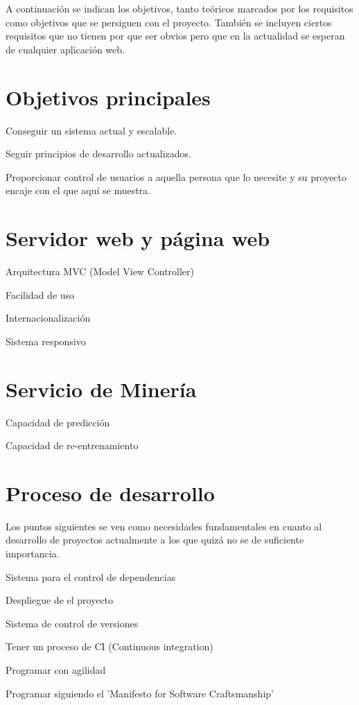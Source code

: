 
A continuación se indican los objetivos, tanto teóricos marcados por los requisitos como objetivos que se persiguen con el proyecto. También se incluyen ciertos requisitos que no tienen por que ser obvios pero que en la actualidad se esperan de cualquier aplicación web.



\section{Objetivos principales} 
\begin{list}{-}{}
\item Conseguir un sistema actual y escalable.
\item Seguir principios de desarrollo actualizados.
\item Proporcionar control de usuarios a aquella persona que lo necesite y su proyecto encaje con el que aquí se muestra.
\end{list}

\section{Servidor web y página web}
\begin{list}{-}{}
\item Arquitectura MVC (Model View Controller)
\item Facilidad de uso
\item Internacionalización
\item Sistema responsivo
\end{list}

\section{Servicio de Minería}
\begin{list}{-}{}
\item Capacidad de predicción
\item Capacidad de re-entrenamiento
\end{list}



\section{Proceso de desarrollo}
Los puntos siguientes se ven como necesidades fundamentales en cuanto al desarrollo de proyectos actualmente a los que quizá no se de suficiente importancia.
\begin{list}{-}{}
\item Sistema para el control de dependencias
\item Despliegue de el proyecto
\item Sistema de control de versiones
\item Tener un proceso de CI (Continuous integration) 
\item Programar con agilidad
\item Programar siguiendo el 'Manifesto for Software Craftsmanship'
\end{list}

